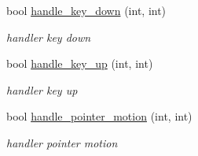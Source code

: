 \begin{Indent}{\bf }\par
{\em \label{_amgrpd41d8cd98f00b204e9800998ecf8427e}
 }\begin{DoxyCompactItemize}
\item 
bool \hyperlink{classnebula_1_1content_1_1actor_1_1admin_1_1controller_a21df7a08d4bc5087833ba0a31be01137}{handle\_\-key\_\-down} (int, int)
\begin{DoxyCompactList}\small\item\em handler key down \item\end{DoxyCompactList}\item 
bool \hyperlink{classnebula_1_1content_1_1actor_1_1admin_1_1controller_a7eb829a7220499807c9f6b08464b85d5}{handle\_\-key\_\-up} (int, int)
\begin{DoxyCompactList}\small\item\em handler key up \item\end{DoxyCompactList}\item 
bool \hyperlink{classnebula_1_1content_1_1actor_1_1admin_1_1controller_a0d6c91e2a563a8e85314ca2511df74e7}{handle\_\-pointer\_\-motion} (int, int)
\begin{DoxyCompactList}\small\item\em handler pointer motion \item\end{DoxyCompactList}\end{DoxyCompactItemize}
\end{Indent}
